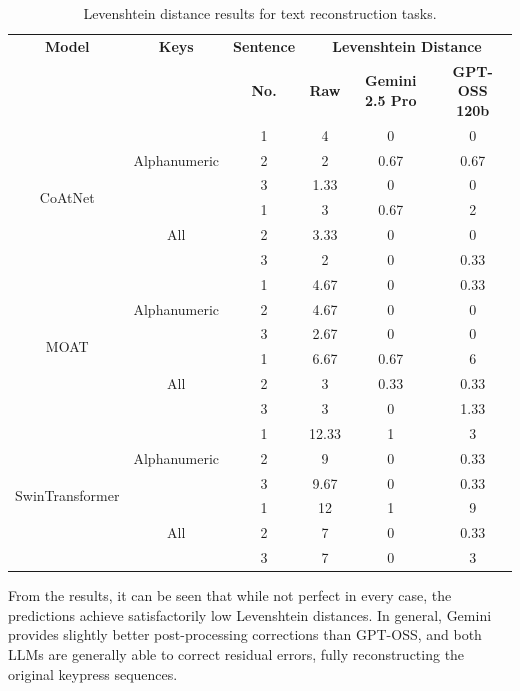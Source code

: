 \documentclass[a4paper,11pt,twoside]{report}
\theoremstyle{definition}
\begin{document}
\begin{table}[h!]
\centering
\caption{Levenshtein distance results for text reconstruction tasks.}
\begin{adjustbox}{max width=\textwidth}
\begin{tabular}{c|c|c|c|c|c}
\hline
\textbf{Model} & \textbf{Keys} & \textbf{Sentence}  &  \multicolumn{3}{c}{\textbf{Levenshtein Distance}} \\
\cline{4-6}
       & & \textbf{No.}& \textbf{Raw}  &   \textbf{Gemini 2.5 Pro}   &  \textbf{GPT-OSS 120b} \\
\hline
\multirow{6}{*}{CoAtNet} & \multirow{3}{*}{Alphanumeric} & 1 & 4 & 0 & 0 \\
& & 2 & 2 & 0.67 & 0.67 \\
& & 3 & 1.33 & 0 & 0 \\
\cline{2-6}
& \multirow{3}{*}{All} & 1 & 3 & 0.67 & 2\\
& & 2 & 3.33 & 0 & 0\\
& & 3 & 2 & 0 & 0.33\\
\hline

\multirow{6}{*}{MOAT} & \multirow{3}{*}{Alphanumeric} & 1 & 4.67 & 0 & 0.33 \\
& & 2 & 4.67 & 0 & 0 \\
& & 3 & 2.67 & 0 & 0 \\
\cline{2-6}
& \multirow{3}{*}{All} & 1 & 6.67 & 0.67 & 6\\
& & 2 & 3 & 0.33 & 0.33 \\
& & 3 & 3 & 0 & 1.33 \\
\hline

\multirow{6}{*}{SwinTransformer} & \multirow{3}{*}{Alphanumeric} & 1 & 12.33 & 1 & 3 \\
& & 2 & 9 & 0 & 0.33 \\
& & 3 & 9.67 & 0 & 0.33 \\
\cline{2-6}
& \multirow{3}{*}{All} & 1 & 12 & 1 & 9 \\
& & 2 & 7 & 0 & 0.33 \\
& & 3 & 7 & 0 & 3 \\
\hline
\end{tabular}
\end{adjustbox}
\label{tab:levenshtein_results}
\end{table}

\vspace{1em}

From the results, it can be seen that while not perfect in every case, the predictions achieve satisfactorily low Levenshtein distances. In general, Gemini provides slightly better post-processing corrections than GPT-OSS, and both LLMs are generally able to correct residual errors, fully reconstructing the original keypress sequences.
\end{document}

